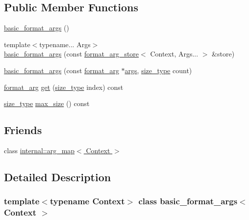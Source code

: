 \subsection*{Public Member Functions}
\begin{DoxyCompactItemize}
\item 
\hyperlink{classbasic__format__args_a1a0b07912511030ffbe01a71e7baee22}{basic\+\_\+format\+\_\+args} ()
\item 
{\footnotesize template$<$typename... Args$>$ }\\\hyperlink{classbasic__format__args_aff6e7b681609f33b18afb00281259ce2}{basic\+\_\+format\+\_\+args} (const \hyperlink{classformat__arg__store}{format\+\_\+arg\+\_\+store}$<$ Context, Args... $>$ \&store)
\item 
\hyperlink{classbasic__format__args_a1ee5ccabb966711853a85daf1ac77689}{basic\+\_\+format\+\_\+args} (const \hyperlink{classbasic__format__args_aa8e7659bf8a41ef7cf889bd3edcbc129}{format\+\_\+arg} $\ast$\hyperlink{printf_8h_a47047b7b28fd1342eef756b79c778580}{args}, \hyperlink{classbasic__format__args_abced2890cde3213027d493494d89c611}{size\+\_\+type} count)
\item 
\hyperlink{classbasic__format__args_aa8e7659bf8a41ef7cf889bd3edcbc129}{format\+\_\+arg} \hyperlink{classbasic__format__args_ad381a683779a65c09c258faa2a0dbbea}{get} (\hyperlink{classbasic__format__args_abced2890cde3213027d493494d89c611}{size\+\_\+type} index) const
\item 
\hyperlink{classbasic__format__args_abced2890cde3213027d493494d89c611}{size\+\_\+type} \hyperlink{classbasic__format__args_a6deab6159b5377124f3a9d6ad5b0bfa2}{max\+\_\+size} () const
\end{DoxyCompactItemize}
\subsection*{Friends}
\begin{DoxyCompactItemize}
\item 
class \hyperlink{classbasic__format__args_a7974100f026be256213827458684be38}{internal\+::arg\+\_\+map$<$ Context $>$}
\end{DoxyCompactItemize}


\subsection{Detailed Description}
\subsubsection*{template$<$typename Context$>$\newline
class basic\+\_\+format\+\_\+args$<$ Context $>$}

